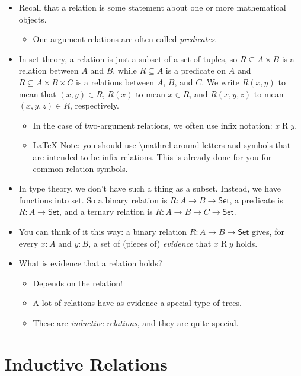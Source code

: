 \documentclass{lecturenotes}
\begin{document}
\begin{itemize}
\item Recall that a relation is some statement about one or more mathematical objects.
  \begin{itemize}
  \item One-argument relations are often called \emph{predicates}.
  \end{itemize}
\item In set theory, a relation is just a subset of a set of tuples, so $R \subseteq A \times B$ is a relation between $A$ and $B$, while $R \subseteq A$ is a predicate on $A$ and $R \subseteq A \times B \times C$ is a relations between $A$, $B$, and $C$.
  We write $R(x,y)$ to mean that $(x, y) \in R$, $R(x)$ to mean $x \in R$, and $R(x,y,z)$ to mean $(x, y, z) \in R$, respectively.
  \begin{itemize}
  \item In the case of two-argument relations, we often use infix notation: $x \mathrel{R} y$.
  \item \LaTeX{} Note: you should use \textbackslash{}mathrel around letters and symbols that are intended to be infix relations.
    This is already done for you for common relation symbols.    
  \end{itemize}
\item In type theory, we don't have such a thing as a subset. Instead, we have functions into set.
  So a binary relation is $R \colon A \to B \to \textsf{Set}$, a predicate is $R \colon A \to \textsf{Set}$, and a ternary relation is $R \colon A \to B \to C \to \textsf{Set}$.
\item You can think of it this way: a binary relation $R \colon A \to B \to \textsf{Set}$ gives, for every $x \colon A$ and $y \colon B$, a set of (pieces of) \emph{evidence} that $x \mathrel{R} y$ holds.
\item What is evidence that a relation holds?
  \begin{itemize}
  \item Depends on the relation!
  \item A lot of relations have as evidence a special type of trees.
  \item These are \emph{inductive relations}, and they are quite special.
  \end{itemize}
\end{itemize}

\section{Inductive Relations}
\label{sec:inductive-relations}
\end{document}
